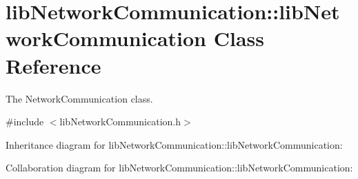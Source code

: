 \hypertarget{classlibNetworkCommunication_1_1libNetworkCommunication}{}\section{lib\+Network\+Communication\+::lib\+Network\+Communication Class Reference}
\label{classlibNetworkCommunication_1_1libNetworkCommunication}


The Network\+Communication class.  




{\ttfamily \#include $<$lib\+Network\+Communication.\+h$>$}



Inheritance diagram for lib\+Network\+Communication\+::lib\+Network\+Communication\+:


Collaboration diagram for lib\+Network\+Communication\+::lib\+Network\+Communication\+:
